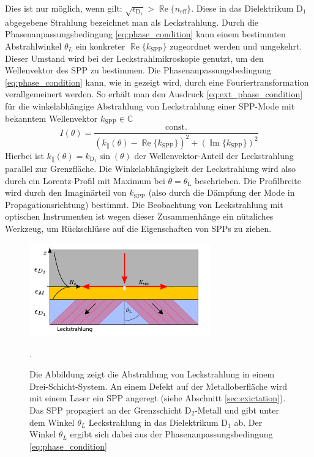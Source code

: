 \documentclass[a4paper, titlepage,  ngerman]{book}
\renewcommand{\Re}{\operatorname{\mathbb{R}e}}
\renewcommand{\Im}{\operatorname{\mathbb{I}m}}
\begin{document}
	Dies ist nur möglich, wenn gilt: {$\sqrt{\epsilon_{\mathrm{D}_1}} > \Re\{n_\mathrm{eff}\}$}. Diese in das Dielektrikum $\mathrm{D}_1$ abgegebene Strahlung bezeichnet man als Leckstrahlung. Durch die Phasenanpassungsbedingung \eqref{eq:phase_condition} kann einem bestimmten Abstrahlwinkel $\theta_L$ ein konkreter $\Re\{k_{\mathrm{SPP}}\}$ zugeordnet werden und umgekehrt. Dieser Umstand wird bei der Leckstrahlmikroskopie genutzt, um den Wellenvektor des SPP zu bestimmen.
	Die Phasenanpassungsbedingung \eqref{eq:phase_condition} kann, wie in \cite{Burke.1986} gezeigt wird, durch eine Fouriertransformation verallgemeinert werden. So erhält man den Ausdruck \eqref{eq:ext_phase_condition} für die winkelabhängige Abstrahlung von Leckstrahlung einer SPP-Mode mit bekanntem Wellenvektor $k_{\mathrm{SPP}} \in \mathbb{C}$
	\begin{equation}
		\label{eq:ext_phase_condition}
		I(\theta) = \dfrac{\text{const.}}{\left(k_{\parallel}(\theta) - \Re\{k_{\mathrm{SPP}}\}\right)^2 + (\Im\{k_{\mathrm{SPP}}\})^2}
	\end{equation}
	Hierbei ist $k_{\parallel}(\theta) = k_{\mathrm{D}_1}\sin(\theta)$ der Wellenvektor-Anteil der Leckstrahlung parallel zur Grenzfläche. Die Winkelabhängigkeit der Leckstrahlung wird also durch ein Lorentz-Profil mit Maximum bei $\theta = \theta_\mathrm{L}$ beschrieben. Die Profilbreite wird durch den Imaginärteil von $k_{\mathrm{SPP}}$ (also durch die Dämpfung der Mode in Propagationsrichtung) bestimmt. Die Beobachtung von Leckstrahlung mit optischen Instrumenten ist wegen dieser Zusammenhänge ein nützliches Werkzeug, um Rückschlüsse auf die Eigenschaften von SPPs zu ziehen.
	\begin{figure} 
		\centering
		\includegraphics[width=0.7\textwidth]{figures/leckstrahlung.pdf}
		\caption[Leckstrahlung Drei-Schicht-System]{Die Abbildung zeigt die Abstrahlung von Leckstrahlung in einem Drei-Schicht-System. An einem Defekt auf der Metalloberfläche wird mit einem Laser ein SPP angeregt (siehe Abschnitt \ref{sec:exictation}). Das SPP propagiert an der Grenzschicht $\mathrm{D}_2$-Metall und gibt unter dem Winkel $\theta_L$ Leckstrahlung in das Dielektrikum $\mathrm{D}_1$ ab. Der Winkel $\theta_L$ ergibt sich dabei aus der Phasenanpassungsbedingung \eqref{eq:phase_condition}}.
		\label{fig:leakage_radiation}
	\end{figure}
\end{document}
